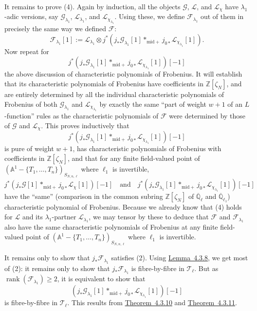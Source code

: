 It remains to prove (4). Again by induction, all the objects
\(\mathcal{G}\), \(\mathcal{L}\), and \(\mathcal{L}_\chi\) have
\(\lambda_1\)-adic versions, say \(\mathcal{G}_{\lambda_1}\),
\(\mathcal{L}_{\lambda_1}\), and \(\mathcal{L}_{\chi_{\lambda_1}}\). Using
these, we define \(\mathcal{F}_{\lambda_1}\) out of them in precisely the same
way we defined \(\mathcal{F}\):
\[
  \mathcal{F}_{\lambda_1}[1]:=
  \mathcal{L}_{\lambda_1}\otimes
  j^*(j_*\mathcal{G}_{\lambda_1}[1]*_{\mathrm{mid}+}
  j_{0*}\mathcal{L}_{\chi_{\lambda_1}}[1]).
\]
Now repeat for
\[
  j^*(j_*\mathcal{G}_{\lambda_1}[1]*_{\mathrm{mid}+}
  j_{0*}\mathcal{L}_{\chi_{\lambda_1}}[1])[-1]
\]
the above discussion of characteristic polynomials of Frobenius. It will
establish that its characteristic polynomials of Frobenius have coefficients
in \(\mathbb{Z}[\zeta_N]\), and are entirely determined by all the individual
characteristic polynomials of Frobenius of both \(\mathcal{G}_{\lambda_1}\) and
\(\mathcal{L}_{\chi_{\lambda_1}}\) by exactly the same ``part of weight
\(w+1\) of an \(L\)-function'' rules as the characteristic polynomials of
\(\mathcal{F}\) were determined by those of \(\mathcal{G}\) and
\(\mathcal{L}_\chi\). This proves inductively that
\[
  j^*(j_*\mathcal{G}_{\lambda_1}[1]*_{\mathrm{mid}+}
  j_{0*}\mathcal{L}_{\chi_{\lambda_1}}[1])[-1]
\]
is pure of weight \(w+1\), has characteristic polynomials of Frobenius with
coefficients in \(\mathbb{Z}[\zeta_N]\), and that for any finite field-valued
point of \((\mathbb{A}^1-\{T_1,\ldots,T_n\})_{S_{N,n,\ell}}\) where
\(\ell_1\) is invertible,
\[
  j^*(j_*\mathcal{G}[1]*_{\mathrm{mid}+}j_{0*}\mathcal{L}_\chi[1])[-1]
  \quad\text{and}\quad
  j^*(j_*\mathcal{G}_{\lambda_1}[1]*_{\mathrm{mid}+}
  j_{0*}\mathcal{L}_{\chi_{\lambda_1}}[1])[-1]
\]
have the ``same'' (comparison in the common subring \(\mathbb{Z}[\zeta_N]\) of
\(\overline{\mathbb{Q}}_\ell\) and \(\overline{\mathbb{Q}}_{\ell_1}\))
characteristic polynomial of Frobenius. Because we already know that (4) holds
for \(\mathcal{L}\) and its \(\lambda_1\)-partner
\(\mathcal{L}_{\lambda_1}\), we may tensor by these to deduce that
\(\mathcal{F}\) and \(\mathcal{F}_{\lambda_1}\) also have the same
characteristic polynomials of Frobenius at any finite field-valued point of
\((\mathbb{A}^1-\{T_1,\ldots,T_n\})_{S_{N,n,\ell}}\) where \(\ell_1\) is
invertible.

It remains only to show that \(j_*\mathcal{F}_{\lambda_1}\) satisfies (2).
Using \hyperref[lem:4.3.8]{Lemma~4.3.8}, we get most of (2): it remains only
to show that \(j_*\mathcal{F}_{\lambda_1}\) is fibre-by-fibre in
\(\mathcal{T}_\ell\). But as \(\operatorname{rank}(\mathcal{F}_{\lambda_1})\geq 2\),
it is equivalent to show that
\[
  (j_*\mathcal{G}_{\lambda_1}[1]*_{\mathrm{mid}+}
  j_{0*}\mathcal{L}_{\chi_{\lambda_1}}[1])[-1]
\]
is fibre-by-fibre in \(\mathcal{T}_\ell\). This results from
\hyperref[thm:4.3.10]{Theorem~4.3.10} and
\hyperref[thm:4.3.11]{Theorem~4.3.11}.

